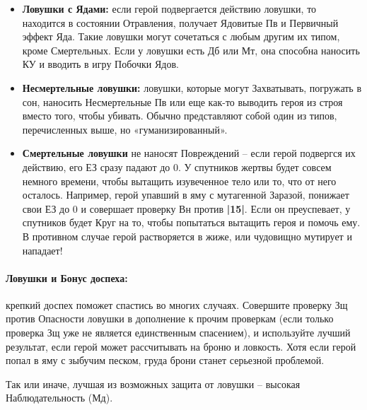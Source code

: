 \begin{itemize}
  \item \textbf{Ловушки с Ядами:} если герой подвергается действию ловушки, то находится в состоянии Отравления, получает Ядовитые Пв и Первичный эффект Яда.
    \newline Такие ловушки могут сочетаться с любым другим их типом, кроме Смертельных. Если у ловушки есть Дб или Мт, она способна наносить КУ и вводить в игру Побочки Ядов.
  \item \textbf{Несмертельные ловушки:} ловушки, которые могут Захватывать, погружать в сон, наносить Несмертельные Пв или еще как-то выводить героя из строя вместо того, чтобы убивать. Обычно представляют собой один из типов, перечисленных выше, но «гуманизированный».
  \item \textbf{Смертельные ловушки} не наносят Повреждений – если герой подвергся их действию, его ЕЗ сразу падают до 0. У спутников жертвы будет совсем немного времени, чтобы вытащить изувеченное тело или то, что от него осталось.
    \newline Например, герой упавший в яму с мутагенной Заразой, понижает свои ЕЗ до 0 и совершает проверку Вн против \textbf{|15|}. Если он преуспевает, у спутников будет Круг на то, чтобы попытаться вытащить героя и помочь ему. В противном случае герой растворяется в жиже, или чудовищно мутирует и нападает!
\end{itemize}
\paragraph{Ловушки и Бонус доспеха:} крепкий доспех поможет спастись во многих случаях. Совершите проверку Зщ против Опасности ловушки в дополнение к прочим проверкам (если только проверка Зщ уже не является единственным спасением), и используйте лучший результат, если герой может рассчитывать на броню и ловкость. Хотя если герой попал в яму с зыбучим песком, груда брони станет серьезной проблемой. 
\begin{tcolorbox}
  Так или иначе, лучшая из возможных защита от ловушки – высокая Наблюдательность (Мд).
\end{tcolorbox}